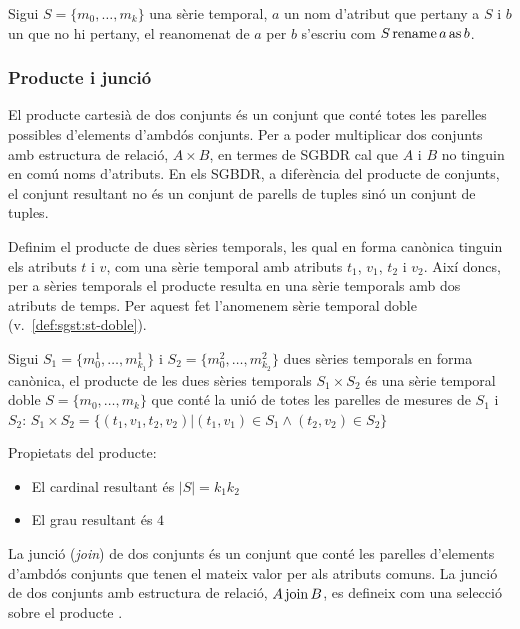 Sigui $S =\{m_0, \dotsc, m_k\}$ una sèrie temporal, $a$ un nom
d'atribut que pertany a $S$ i $b$ un que no hi pertany, el reanomenat
de $a$ per $b$ s'escriu com $S \operatorname*{rename} a \operatorname*{as} b$.





\subsubsection{Producte i junció}

El producte cartesià de dos conjunts és un conjunt que conté totes les
parelles possibles d'elements d'ambdós conjunts.  Per a poder
multiplicar dos conjunts amb estructura de relació, $A \times B$, en
termes de SGBDR cal que $A$ i $B$ no tinguin en comú noms d'atributs.
En els SGBDR, a diferència del producte de conjunts, el conjunt
resultant no és un conjunt de parells de tuples sinó un conjunt de
tuples.

\todo{} Definim el producte de dues sèries temporals, les qual en
forma canònica tinguin els atributs $t$ i $v$, com una sèrie temporal
amb atributs $t_1$, $v_1$, $t_2$ i $v_2$. Així doncs, per a sèries
temporals el producte resulta en una sèrie temporals amb dos atributs
de temps. Per aquest fet l'anomenem sèrie temporal doble
(v.\ \autoref{def:sgst:st-doble}).
\begin{definition}[producte]
  Sigui $S_1=\{m_0^1, \dotsc, m_{k_1}^1\}$ i $S_2=\{m_0^2, \dotsc,
  m_{k_2}^2\}$ dues sèries temporals en forma canònica, el producte de
  les dues sèries temporals $S_1 \times S_2$ és una sèrie temporal
  doble $S=\{m_0, \dotsc, m_k\}$ que conté la unió de totes les
  parelles de mesures de $S_1$ i $S_2$: $S_1 \times S_2 = \{
  (t_1,v_1,t_2,v_2) | (t_1,v_1) \in S_1 \wedge (t_2,v_2) \in S_2 \}$
\end{definition}

Propietats del producte:
\begin{itemize}
\item El cardinal resultant és $|S|=k_1k_2$
\item El grau resultant és $4$
\end{itemize}



La junció (\emph{join}) de dos conjunts és un conjunt que conté les
parelles d'elements d'ambdós conjunts que tenen el mateix valor per
als atributs comuns.  La junció de dos conjunts amb estructura de
relació, $A \operatorname*{join} B$, es defineix com una selecció sobre el
producte \parencite{date:introduction}.


